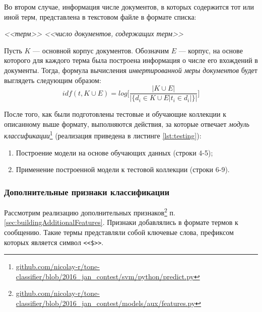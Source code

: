     Во втором случае, информация числе документов, в которых содержится тот или
    иной терм, представлена в текстовом файле в формате списка:
    \begin{center}
        \it
        <<терм>> <<число документов, содержащих терм>>
    \end{center}

    Пусть $K$ --- основной корпус документов.
    Обозначим $E$ --- корпус, на основе которого для каждого терма была построена
    информация о числе его вхождений в документы.
    Тогда, формула вычисления {\it инвертированной меры документов} будет выглядеть
    следующим образом:
    \begin{equation}
        idf(t, K \cup E) = log \Bigg[ \dfrac{|K \cup E|}{|\{d_i \in K \cup E | t_i \in d_i|\}|} \Bigg]
    \end{equation}

    После того, как были подготовлены тестовые и обучающие коллекции к
    описанному выше формату, выполняются действия, за которые
    отвечает {\it модуль классификации}\footnote{
        \url{github.com/nicolay-r/tone-classifier/blob/2016_jan_contest/svm/python/predict.py}
    } (реализация приведена в листинге
    \ref{lst:testing}):
    \begin{enumerate}
        \item Построение модели на основе обучающих данных (строки 4-5);
        \item Применение построенной модели к тестовой коллекции (строки 6-9).
    \end{enumerate}

    \lstset{style=python}
    


    \subsubsection{Дополнительные признаки классификации}
    Рассмотрим реализацию дополнительных признаков\footnote{ \url{github.com/nicolay-r/tone-classifier/blob/2016_jan_contest/models/aux/features.py} }
    п. \ref{sec:buildingAdditionalFeatures}.
    Признаки добавлялись в формате термов к сообщению.
    Такие термы представляли собой ключевые слова, префиксом которых является
    символ {\tt <<\$>>}.

